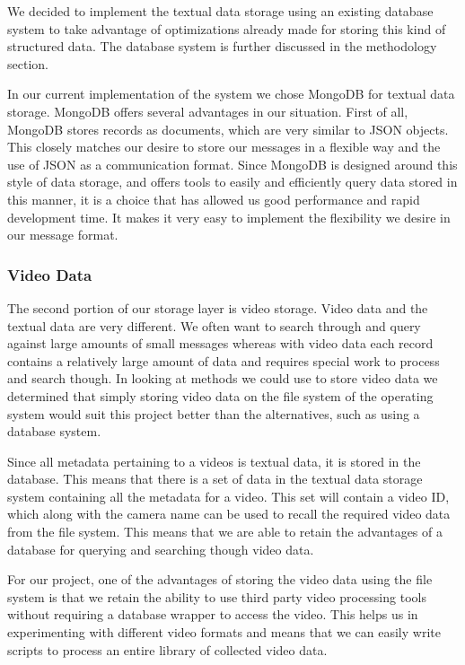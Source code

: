 We decided to implement the textual data storage using an existing database
system to take advantage of optimizations already made for storing this kind of
structured data. The database system is further discussed in the methodology
section.

In our current implementation of the system we chose MongoDB\cite{mongo_home}
for textual data storage. MongoDB offers several advantages in our situation.
First of all, MongoDB stores records as documents, which are very similar to
JSON objects.  This closely matches our desire to store our messages in a
flexible way and the use of JSON as a communication format. Since MongoDB is
designed around this style of data storage, and offers tools to easily and
efficiently query data stored in this manner, it is a choice that has allowed us
good performance and rapid development time. It makes it very easy to implement
the flexibility we desire in our message format.

\subsubsection{Video Data}

The second portion of our storage layer is video storage. Video data and the
textual data are very different. We often want to search through and query
against large amounts of small messages whereas with video data each record
contains a relatively large amount of data and requires special work to process
and search though. In looking at methods we could use to store video data we
determined that simply storing video data on the file system of the operating
system would suit this project better than the alternatives, such as using a
database system.

Since all metadata pertaining to a videos is textual data, it is stored in the
database. This means that there is a set of data in the textual data
storage system containing all the metadata for a video. This set will contain a
video ID, which along with the camera name can be used to recall the required
video data from the file system. This means that we are able to retain the
advantages of a database for querying and searching though video data.

For our project, one of the advantages of storing the video data using
the file system is that we retain the ability to use third party video
processing tools without requiring a database wrapper to access the video. This
helps us in experimenting with different video formats and means that we can 
easily write scripts to process an entire library of collected video data.

